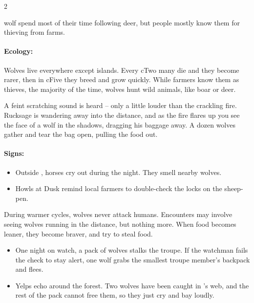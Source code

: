 \begin{multicols}{2}
\stirgeSwarm

  {wolf}%
spend most of their time following deer, but people mostly know them for thieving from farms.

\paragraph{Ecology:} Wolves live everywhere except islands.
Every \gls{cTwo} many die and they become rarer, then in \gls{cFive} they breed and grow quickly.
While farmers know them as thieves, the majority of the time, wolves hunt wild animals, like boar or deer.

\begin{boxtext}
  A feint scratching sound is heard -- only a little louder than the crackling fire.
  Rucksage is wandering away into the distance, and as the fire flares up you see the face of a wolf in the shadows, dragging his baggage away.
  A dozen wolves gather and tear the bag open, pulling the food out.
\end{boxtext}


\paragraph{Signs:}
\begin{itemize}
  \item
  Outside , horses cry out during the night.
  They smell nearby wolves.
  \item
  Howls at Dusk remind local farmers to double-check the locks on the sheep-pen.
\end{itemize}

\showEnc
During warmer \glspl{cycle}, wolves never attack humans.
Encounters may involve seeing wolves running in the distance, but nothing more.
When food becomes leaner, they become braver, and try to steal food.

\medbreak

\begin{itemize}
  \item
  One night on watch, a pack of wolves stalks the troupe.
  If the watchman fails the  check to stay alert, one wolf grabs the smallest troupe member's backpack and flees.
  \item
  Yelps echo around the forest.
  Two wolves have been caught in 's web, and the rest of the pack cannot free them, so they just cry and bay loudly.
\end{itemize}


\end{multicols}
